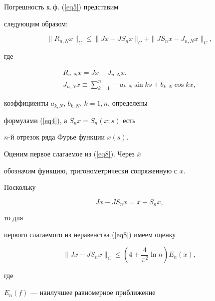\begin{pf}


Погрешность к.\,ф. (\ref{eq5}) представим


следующим образом:


\begin{equation}\label{eq8}


\|R_{n,N}x\|_C\leq\|Jx-JS_nx\|_C+\|JS_nx-J_{n,N}x\|_C,


\end{equation}


где


\begin{gather*}


R_{n,N}x=Jx-J_{n,N}x, \\


J_{n,N}x\equiv\sum_{k=1}^n-a_{k,N}\sin ks+b_{k,N}\cos kx,


\end{gather*}


коэффициенты $a_{k,N}$, $b_{k,N}$, $k=\overline{1,n}$, определены


формулами (\ref{eq4}), а $S_nx=S_n(x;s)$ есть


$n$-й отрезок ряда Фурье функции $x(s)$.





Оценим первое слагаемое из (\ref{eq8}). Через $\overline{x}$


обозначим функцию, тригонометрически сопряженную с $x$.


Поскольку


$$




Jx-JS_nx=\overline{x}-S_n\overline{x},




$$


то для


первого слагаемого из неравенства (\ref{eq8}) имеем оценку


\begin{equation}\label{eq10}


\|Jx-JS_nx\|_C\leq(4+\frac{4}{\pi^2}\ln


n)E_n(\overline{x}),


\end{equation}


где


$E_n(f)$ --- наилучшее равномерное приближение



\end{pf}
